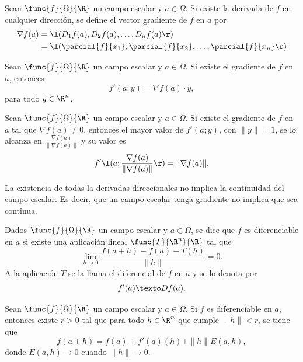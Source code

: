 \documentclass[a4,11pt]{aleph-notas}
\begin{document}
\begin{defi}
    Sean $\func{f}{\Omega}{\R}$ un campo escalar y $a\in \Omega$. Si existe la derivada de $f$ en cualquier dirección, se define el vector gradiente de $f$ en $a$ por
    \begin{align*}
        \nabla f(a)
            & =\l(D_1 f(a), D_2 f(a),\ldots, D_n f(a)\r) \\
            & = \l(\parcial{f}{x_1}, \parcial{f}{x_2},\ldots, \parcial{f}{x_n} \r)
    \end{align*}
\end{defi}

\begin{prop}
    Sean $\func{f}{\Omega}{\R}$ un campo escalar y $a\in \Omega$. Si existe el gradiente de $f$ en $a$, entonces
    \[
        f'(a;y)=\nabla f(a)\cdot y,
    \]
    para todo $y\in\R^n$.
\end{prop}

\begin{prop}
    Sean $\func{f}{\Omega}{\R}$ un campo escalar y $a\in \Omega$. Si existe el gradiente de $f$ en $a$ tal que $\nabla f(a)\neq 0$, entonces el mayor valor de $f'(a;y)$, con $\|y\|=1$, se lo alcanza en $\frac{\nabla f(a)}{\|\nabla f(a)\|}$ y su valor es
    \[
        f'\l(a;\frac{\nabla f(a)}{\|\nabla f(a)\|}\r)=\|\nabla f(a)\|.
    \]
\end{prop}

\begin{advertencia}
    La existencia de todas la derivadas direccionales no implica la continuidad del campo escalar. Es decir, que un campo escalar tenga gradiente no implica que sea continua.
\end{advertencia}

\begin{defi}
    Dados $\func{f}{\Omega}{\R}$ un campo escalar y $a\in \Omega$, se dice que $f$ es diferenciable en $a$ si existe una aplicación lineal $\func{T}{\R^n}{\R}$ tal que
    \[
        \lim_{h\to 0}\frac{f(a+h)-f(a)-T(h)}{\|h\|}=0.
    \]
    A la aplicación $T$ se la llama el diferencial de $f$ en $a$ y se lo denota por
    \[
        f'(a)
        \texto
        Df(a).
    \]
\end{defi}

\begin{prop}
    Sean $\func{f}{\Omega}{\R}$ un campo escalar y $a\in \Omega$. Si $f$ es diferenciable en $a$, entonces existe $r>0$ tal que para todo $h\in\R^n$ que cumple $\|h\|<r$, se tiene que
    \[
        f(a+h)=f(a)+f'(a)(h)+\|h\|E(a,h),
    \]
    donde $E(a,h)\to 0$ cuando $\|h\|\to 0$.
\end{prop}
\end{document}
